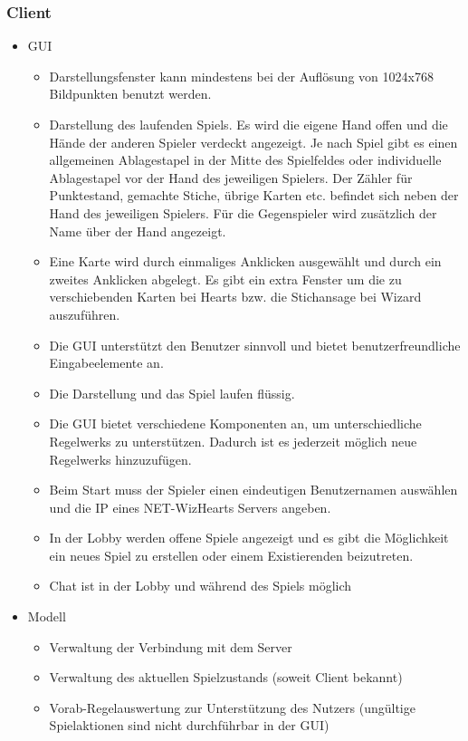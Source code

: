 \documentclass{article}
\begin{document}
\subsubsection{\gls{Client}}
\begin{itemize}
	\item GUI
	\begin{itemize}
		\item Darstellungsfenster kann mindestens bei der Auflösung von 1024x768 Bildpunkten benutzt werden.
		\item Darstellung des laufenden Spiels. Es wird die eigene Hand offen und die Hände der anderen Spieler verdeckt 					angezeigt. Je nach Spiel gibt es einen allgemeinen Ablagestapel in der Mitte des Spielfeldes oder individuelle 					Ablagestapel vor der Hand des jeweiligen Spielers. Der Zähler für Punktestand, gemachte Stiche, übrige Karten 					etc. befindet sich neben  der Hand des jeweiligen Spielers. Für die Gegenspieler wird zusätzlich der Name über 					der Hand angezeigt.
		\item Eine Karte wird durch einmaliges Anklicken ausgewählt und durch ein zweites Anklicken abgelegt. Es gibt ein extra 					Fenster um die zu verschiebenden Karten bei Hearts bzw. die Stichansage bei Wizard auszuführen.
		\item Die GUI unterstützt den Benutzer sinnvoll  und bietet benutzerfreundliche Eingabeelemente an.
		\item Die Darstellung und das Spiel laufen flüssig.
		\item Die GUI bietet verschiedene Komponenten an, um unterschiedliche \glspl{Regelwerk} zu unterstützen. Dadurch ist es jederzeit möglich neue \glspl{Regelwerk} hinzuzufügen.
		\item Beim Start muss der Spieler einen eindeutigen Benutzernamen auswählen und die IP eines NET-WizHearts \gls{Server}s angeben.
		\item In der \gls{Lobby} werden offene Spiele angezeigt und es gibt die Möglichkeit ein neues Spiel zu erstellen oder 					einem Existierenden beizutreten.
		\item Chat ist in der \gls{Lobby} und während des Spiels möglich
	\end{itemize}
	\item Modell
	\begin{itemize}
		\item Verwaltung der Verbindung mit dem \gls{Server}
		\item Verwaltung des aktuellen Spielzustands (soweit \gls{Client} bekannt)
		\item Vorab-Regelauswertung zur Unterstützung des Nutzers (ungültige Spielaktionen sind nicht durchführbar in der 					GUI)
	\end{itemize}
\end{itemize}
\end{document}
